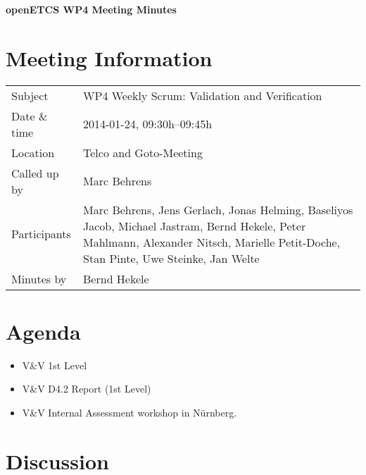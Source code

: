 \documentclass[a4paper, 11pt]{article}
\begin{document}
{\begin{center}\huge\bf openETCS WP4 Meeting Minutes\end{center}}
\section{Meeting Information}

\renewcommand{\arraystretch}{1.5}
\begin{supertabular}{m{.2\textwidth}m{.8\textwidth}}
Subject & WP4 Weekly Scrum: Validation and Verification\\
Date \& time & 2014-01-24, 09:30h--09:45h\\
Location & Telco and Goto-Meeting\\
Called up by & Marc Behrens\\
Participants &
Marc Behrens,
Jens Gerlach,
Jonas Helming,
Baseliyos Jacob,
Michael Jastram,
Bernd Hekele,
Peter Mahlmann,
Alexander Nitsch,
Marielle Petit-Doche,
Stan Pinte,
Uwe Steinke,
Jan Welte
\\

Minutes by & Bernd Hekele\\

\end{supertabular}
\renewcommand{\arraystretch}{1.0}


\section{{Agenda}}
\begin{itemize}
\item V\&V 1st Level 
\item V\&V D4.2 Report (1st Level)
\item V\&V Internal Assessment workshop in N\"urnberg.

\end{itemize}

\section{Discussion}
\end{document}
